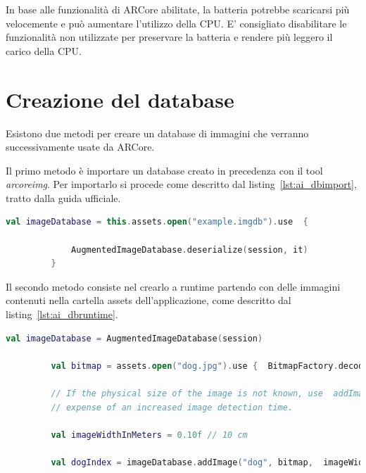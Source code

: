 \documentclass[crop=false, class=book]{standalone}
\begin{document}
	In base alle funzionalità di ARCore abilitate, la batteria potrebbe scaricarsi più velocemente e può aumentare l’utilizzo della CPU. E’ consigliato disabilitare le funzionalità non utilizzate per preservare la batteria e rendere più leggero il carico della CPU.
	
	\section{Creazione del database}
	Esistono due metodi per creare un database di immagini che verranno successivamente usate da ARCore.
	
	Il primo metodo è importare un database creato in precedenza con il tool \textit{arcoreimg}.
	Per importarlo si procede come descritto dal listing~\vref{lst:ai_dbimport}, tratto dalla guida ufficiale.
	
	\begin{center}
		\begin{minipage}{0.95\textwidth}
		\begin{lstlisting}[caption={Importazione database.}, label={lst:ai_dbimport}, language=Kotlin]
		 val imageDatabase = this.assets.open("example.imgdb").use  {
			
			 AugmentedImageDatabase.deserialize(session, it)
		 }
		\end{lstlisting}
		\end{minipage}
	\end{center}
	
	Il secondo metodo consiste nel crearlo a runtime partendo con delle immagini contenuti nella cartella assets dell’applicazione, come descritto dal listing~\vref{lst:ai_dbruntime}.
	
	\begin{center}
		\begin{minipage}{0.95\textwidth}
		\begin{lstlisting}[caption={Creazione del database.}, label={lst:ai_dbruntime}, language=Kotlin]
		 val imageDatabase = AugmentedImageDatabase(session)
		
		 val bitmap = assets.open("dog.jpg").use {  BitmapFactory.decodeStream(it) }
		
		 // If the physical size of the image is not known, use  addImage(String, Bitmap) instead, at the
		 // expense of an increased image detection time.
		
		 val imageWidthInMeters = 0.10f // 10 cm
		
		 val dogIndex = imageDatabase.addImage("dog", bitmap,  imageWidthInMeters)
		\end{lstlisting}
		\end{minipage}
	\end{center}
	
\end{document}
